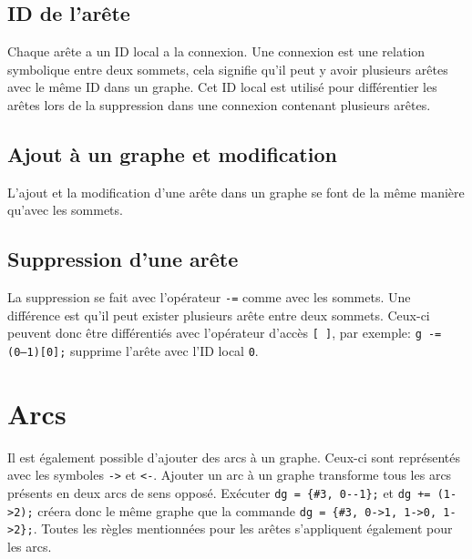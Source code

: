 \documentclass[french]{article}
\begin{document}
		\subsection{ID de l'arête}
		Chaque arête a un ID local a la connexion. Une connexion est une relation symbolique entre deux sommets, cela signifie qu'il peut y avoir plusieurs arêtes avec le même ID dans un graphe. Cet ID local est utilisé pour différentier les arêtes lors de la suppression dans une connexion contenant plusieurs arêtes.
	
		\subsection{Ajout à un graphe et modification}
		L'ajout et la modification d'une arête dans un graphe se font de la même manière qu'avec les sommets.
		
		\subsection{Suppression d'une arête}
		La suppression se fait avec l'opérateur \texttt{-=} comme avec les sommets. Une différence est qu'il peut exister plusieurs arête entre deux sommets. Ceux-ci peuvent donc être différentiés avec l'opérateur d'accès \texttt{[ ]}, par exemple: \texttt{g -= (0--1)[0];} supprime l'arête avec l'ID local \texttt{0}.
		
	\section{Arcs}
	Il est également possible d'ajouter des arcs à un graphe. Ceux-ci sont représentés avec les symboles \texttt{->} et \texttt{<-}. Ajouter un arc à un graphe transforme tous les arcs présents en deux arcs de sens opposé. Exécuter \texttt{dg = \{\#3, 0-{}-1\};} et \texttt{dg += (1->2);} créera donc le même graphe que la commande \texttt{dg = \{\#3, 0->1, 1->0, 1->2\};}. Toutes les règles mentionnées pour les arêtes s'appliquent également pour les arcs.
	
	
		
\end{document}
